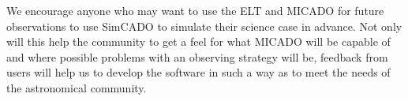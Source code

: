 We encourage anyone who may want to use the ELT and MICADO for future observations to use SimCADO to simulate their science case in advance. Not only will this help the community to get a feel for what MICADO will be capable of and where possible problems with an observing strategy will be, feedback from users will help us to develop the software in such a way as to meet the needs of the astronomical community.